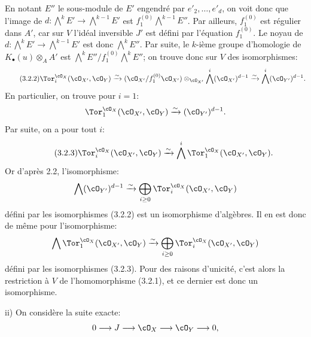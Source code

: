 En
notant \(E''\) le sous-module de \(E'\) engendré par \(e'_2,\ldots,e'_d\), on voit donc que l'image de \(d:\bigwedge^kE'\longrightarrow\bigwedge^{k-1}E'\) est \(f_1^{(0)}\bigwedge^{k-1}E''\). Par ailleurs, \(f_1^{(0)}\) est régulier dans \(A'\), car sur \(V\) l'idéal inversible \(J'\) est défini par l'équation \(f_1^{(0)}\). Le noyau de \(d:\bigwedge^kE'\longrightarrow\bigwedge^{k-1}E'\) est donc \(\bigwedge^kE''\). Par suite, le \(k\)-ième groupe d'homologie de \(K_\bullet(u)\otimes_AA'\) est \(\bigwedge^kE''/f_1^{(0)}\bigwedge^kE''\); on trouve donc sur \(V\) des isomorphismes:
\begin{equation}\tag{3.2.2}
\Tor_i^{\cO_X}(\cO_{X'},\cO_Y)
\xrightarrow{\sim}
(\cO_{X'}/f_1^{(0)}\cO_{X'})\otimes_{\cO_{X'}}
\bigwedge^i(\cO_{X'})^{d-1}
\xrightarrow{\sim}
\bigwedge^i(\cO_{Y'})^{d-1}.
\end{equation}
En particulier, on trouve pour \(i=1\):
\[
\Tor_1^{\cO_X}(\cO_{X'},\cO_Y)
\xrightarrow{\sim}
(\cO_{Y'})^{d-1}.
\]
Par suite, on a pour tout \(i\):
\begin{equation}\tag{3.2.3}
\Tor_i^{\cO_X}(\cO_{X'},\cO_Y)
\xrightarrow{\sim}
\bigwedge^i\Tor_1^{\cO_X}(\cO_{X'},\cO_Y).
\end{equation}
Or d'après 2.2, l'isomorphisme:
\[
\bigwedge(\cO_{Y'})^{d-1}
\xrightarrow{\sim}
\bigoplus_{i\ge0}\Tor_i^{\cO_X}(\cO_{X'},\cO_Y)
\]
défini par les isomorphismes (3.2.2) est un isomorphisme d'algèbres. Il en est donc de même pour l'isomorphisme:
\[
\bigwedge\Tor_1^{\cO_X}(\cO_{X'},\cO_Y)
\xrightarrow{\sim}
\bigoplus_{i\ge0}\Tor_i^{\cO_X}(\cO_{X'},\cO_Y)
\]
défini par les isomorphismes (3.2.3). Pour des raisons d'unicité, c'est alors la restriction à \(V\) de l'homomorphisme (3.2.1), et ce dernier est donc un isomorphisme.

ii) On considère la suite exacte:
\[
0\longrightarrow J\longrightarrow\cO_X\longrightarrow\cO_Y\longrightarrow0,
\]
